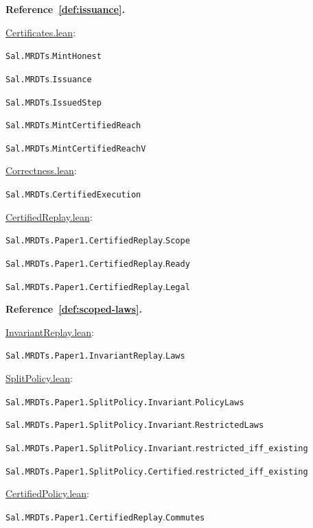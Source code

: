 \medskip\noindent\textbf{Reference~\ref{def:issuance}.}\par\nobreak
\noindent\href{https://github.com/fplaunchpad/sal/blob/07fe525/Sal/MRDTs/Framework/Certificates.lean}{Certificates.lean}:\par
{\small\nolinkurl{Sal.MRDTs}.\allowbreak\nolinkurl{MintHonest}}\par
{\small\nolinkurl{Sal.MRDTs}.\allowbreak\nolinkurl{Issuance}}\par
{\small\nolinkurl{Sal.MRDTs}.\allowbreak\nolinkurl{IssuedStep}}\par
{\small\nolinkurl{Sal.MRDTs}.\allowbreak\nolinkurl{MintCertifiedReach}}\par
{\small\nolinkurl{Sal.MRDTs}.\allowbreak\nolinkurl{MintCertifiedReachV}}\par
\noindent\href{https://github.com/fplaunchpad/sal/blob/paper1/Sal/MRDTs/Metatheory/Correctness.lean}{Correctness.lean}:\par
{\small\nolinkurl{Sal.MRDTs}.\allowbreak\nolinkurl{CertifiedExecution}}\par
\noindent\href{https://github.com/fplaunchpad/sal/blob/07fe525/Sal/MRDTs/Paper1/CertifiedReplay.lean}{CertifiedReplay.lean}:\par
{\small\nolinkurl{Sal.MRDTs.Paper1.CertifiedReplay}.\allowbreak\nolinkurl{Scope}}\par
{\small\nolinkurl{Sal.MRDTs.Paper1.CertifiedReplay}.\allowbreak\nolinkurl{Ready}}\par
{\small\nolinkurl{Sal.MRDTs.Paper1.CertifiedReplay}.\allowbreak\nolinkurl{Legal}}\par

\medskip\noindent\textbf{Reference~\ref{def:scoped-laws}.}\par\nobreak
\noindent\href{https://github.com/fplaunchpad/sal/blob/07fe525/Sal/MRDTs/Paper1/InvariantReplay.lean}{InvariantReplay.lean}:\par
{\small\nolinkurl{Sal.MRDTs.Paper1.InvariantReplay}.\allowbreak\nolinkurl{Laws}}\par
\noindent\href{https://github.com/fplaunchpad/sal/blob/paper1/Sal/MRDTs/Paper1/SplitPolicy.lean}{SplitPolicy.lean}:\par
{\small\nolinkurl{Sal.MRDTs.Paper1.SplitPolicy.Invariant}.\allowbreak\nolinkurl{PolicyLaws}}\par
{\small\nolinkurl{Sal.MRDTs.Paper1.SplitPolicy.Invariant}.\allowbreak\nolinkurl{RestrictedLaws}}\par
{\small\nolinkurl{Sal.MRDTs.Paper1.SplitPolicy.Invariant}.\allowbreak\nolinkurl{restricted_iff_existing}}\par
{\small\nolinkurl{Sal.MRDTs.Paper1.SplitPolicy.Certified}.\allowbreak\nolinkurl{restricted_iff_existing}}\par
\noindent\href{https://github.com/fplaunchpad/sal/blob/07fe525/Sal/MRDTs/Paper1/CertifiedPolicy.lean}{CertifiedPolicy.lean}:\par
{\small\nolinkurl{Sal.MRDTs.Paper1.CertifiedReplay}.\allowbreak\nolinkurl{Commutes}}\par

